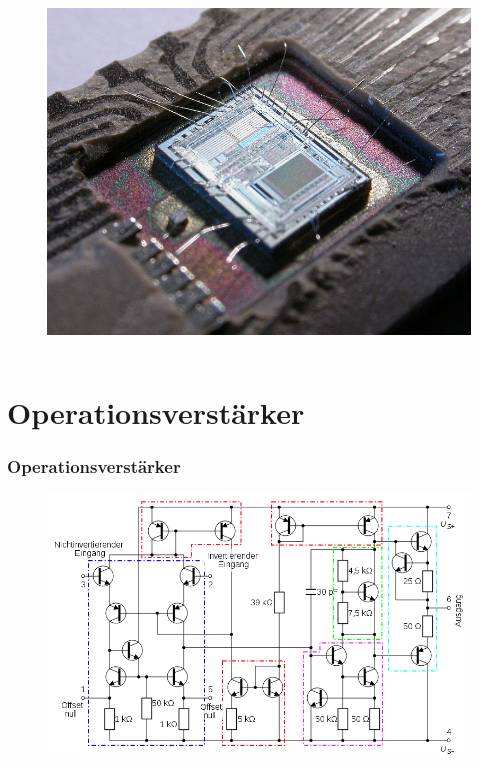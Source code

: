 \begin{frame}
\begin{columns}
\begin{center}
\begin{figure}
        \includegraphics[width=\textwidth,height=.6\textheight,keepaspectratio]{a06/IC2.jpg}
      \end{figure}
    \end{center}
  \end{columns}
\end{frame}

\section*{Operations\-verstärker}

\begin{frame}
  \frametitle{Operationsverstärker}
  \begin{center}
    \begin{figure}
      \includegraphics[width=\textwidth,height=.85\textheight,keepaspectratio]{a06/OPV-intern.png}
    \end{figure}
  \end{center}
\end{frame}

